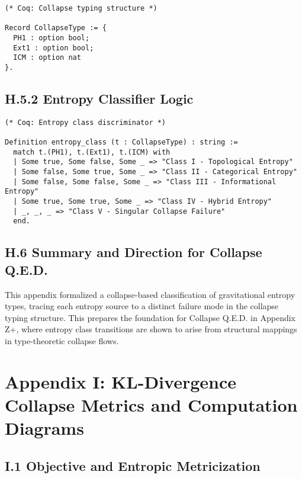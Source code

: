 \documentclass[11pt]{article}
\begin{document}
\begin{lstlisting}
(* Coq: Collapse typing structure *)

Record CollapseType := {
  PH1 : option bool;
  Ext1 : option bool;
  ICM : option nat
}.
\end{lstlisting}

\subsection*{H.5.2 Entropy Classifier Logic}

\begin{lstlisting}
(* Coq: Entropy class discriminator *)

Definition entropy_class (t : CollapseType) : string :=
  match t.(PH1), t.(Ext1), t.(ICM) with
  | Some true, Some false, Some _ => "Class I - Topological Entropy"
  | Some false, Some true, Some _ => "Class II - Categorical Entropy"
  | Some false, Some false, Some _ => "Class III - Informational Entropy"
  | Some true, Some true, Some _ => "Class IV - Hybrid Entropy"
  | _, _, _ => "Class V - Singular Collapse Failure"
  end.
\end{lstlisting}

\subsection*{H.6 Summary and Direction for Collapse Q.E.D.}

This appendix formalized a collapse-based classification of gravitational entropy types, tracing each entropy source to a distinct failure mode in the collapse typing structure. This prepares the foundation for Collapse Q.E.D. in Appendix Z+, where entropy class transitions are shown to arise from structural mappings in type-theoretic collapse flows.



\section*{Appendix I: KL-Divergence Collapse Metrics and Computation Diagrams}

\subsection*{I.1 Objective and Entropic Metricization}
\end{document}
